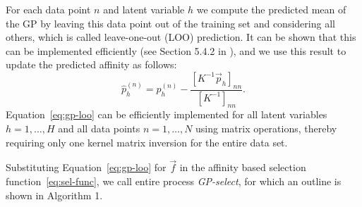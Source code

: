 For each data point $n$ and latent variable $h$ we compute the predicted mean of the GP by leaving 
this data point out of the training set and considering all others, which is called leave-one-out (LOO) prediction.
It can be shown that this can be implemented efficiently (see Section 5.4.2 in \citep{RasmussenGPbook}), 
and we use this result to update the predicted affinity as follows:
%
%
\vspace{-.2cm}  %
\begin{equation}\label{eq:gp-loo}
\hat{p}_{h}^{(n)} =   
p_{h}^{(n)} - \frac{ [ K^{-1} \vec{p}_{h} ]_{nn} }{ [ K^{-1} ]_{nn} }.
\end{equation}
%
%
Equation~\eqref{eq:gp-loo} can be efficiently implemented for all latent variables $h=1,\dots,H$ and all data points $n=1,\dots,N$ using matrix operations, thereby requiring only one kernel matrix inversion for the entire data set.
%
%
%

Substituting Equation~\eqref{eq:gp-loo} for $\vec{f}$ in the affinity based selection function~\eqref{eq:sel-func}, 
we call entire process \textit{GP-select}, for which an outline is shown in Algorithm 1.

